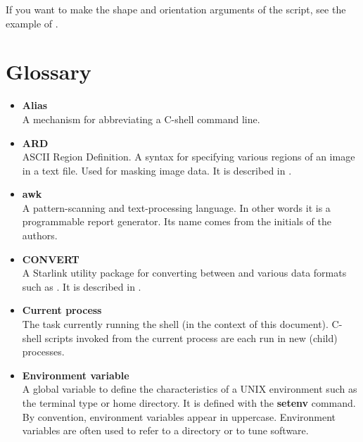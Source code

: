 \documentclass[twoside,11pt,nolof]{starlink}
\begin{document}
If you want to make the shape and orientation arguments of the script,
see the example of 
.

\newpage
\section{Glossary\label{sc4_sc:glossary}}

\begin{itemize}

\item {\bf\label{sc4_gl_alias}Alias}\\
      A mechanism for abbreviating a C-shell command line.

\item {\bf\label{sc4_gl_ard}ARD}\\
      ASCII Region Definition.  A syntax for specifying various
      regions of an image in a text file.  Used for masking image data.
      It is described in .

\item {\bf\label{sc4_gl_awk}awk}\\
      A pattern-scanning and text-processing language.  In other words
      it is a programmable report generator.  Its name comes from the
      initials of the authors.

\item {\bf\label{sc4_gl_convert}CONVERT}\\
      A Starlink utility package for converting between
       and various data formats such as
      .  It is described in
      .

\item {\bf\label{sc4_gl_cur}Current process}\\
      The task currently running the shell (in the context of this
      document).  C-shell scripts invoked from the current process
      are each run in new (child) processes.

\item {\bf\label{sc4_gl_env}Environment variable}\\
      A global variable to define the characteristics of a UNIX
      environment such as the terminal type or home directory.  It is
      defined with the \textbf{setenv} command.  By convention, environment
      variables appear in uppercase.  Environment variables are often
      used to refer to a directory or to tune software.


\end{itemize}
\end{document}

